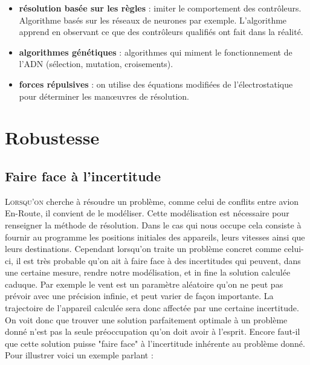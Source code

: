 \begin{itemize}
\item \textbf{résolution basée sur les règles} : imiter le comportement des contrôleurs. Algorithme basés sur les réseaux de neurones par exemple. L'algorithme apprend en observant ce que des contrôleurs qualifiés ont fait dans la réalité. \\
\item \textbf{algorithmes génétiques} : algorithmes qui miment le fonctionnement de l'ADN (sélection, mutation, croisements). \\
\item \textbf{forces répulsives} : on utilise des équations modifiées de l'électrostatique pour déterminer les manœuvres de résolution.
\end{itemize}





\section{Robustesse}
\subsection{Faire face à l'incertitude}
\lettrine{L}{orsqu'on} cherche à résoudre un problème, comme celui de conflits entre avion En-Route, il convient de le modéliser. Cette modélisation est nécessaire pour renseigner la méthode de résolution. Dans le cas qui nous occupe cela consiste à fournir au programme les positions initiales des appareils, leurs vitesses ainsi que leurs destinations. Cependant lorsqu'on traite un problème concret comme celui-ci, il est très probable qu'on ait à faire face à des incertitudes qui peuvent, dans une certaine mesure, rendre notre modélisation, et in fine la solution calculée caduque. Par exemple le vent est un paramètre aléatoire qu'on ne peut pas prévoir avec une précision infinie, et peut varier de façon importante. La trajectoire de l'appareil calculée sera donc affectée par une certaine incertitude. \\


On voit donc que trouver une solution parfaitement optimale à un problème donné n'est pas la seule préoccupation qu'on doit avoir à l'esprit. Encore faut-il que cette solution puisse "faire face" à l'incertitude inhérente au problème donné. Pour illustrer voici un exemple parlant : \\


